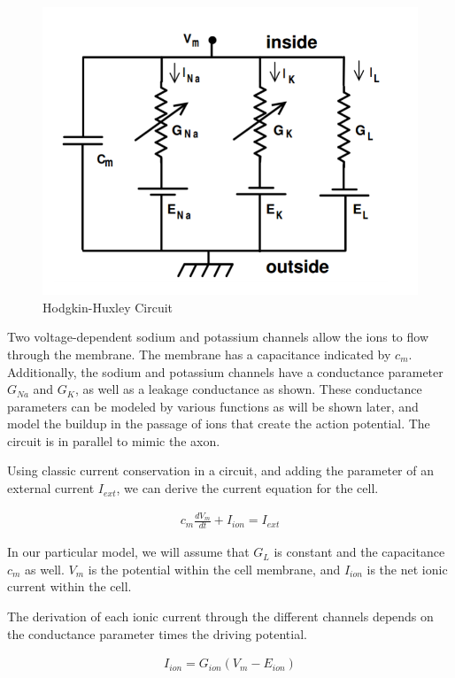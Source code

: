 \documentclass[12]{amsbook}
\newcommand\0{\mathbf{0}}
\newcommand\<{\langle}
\renewcommand\>{\rangle}
\begin{document}
\begin{figure}[h]
    \centering
    \includegraphics[scale=0.5]{hhmodel}
    \caption{Hodgkin-Huxley Circuit}
    \label{fig:my_label}
\end{figure}

Two voltage-dependent sodium and potassium channels allow the ions to flow through the membrane. The membrane has a capacitance indicated by $c_m$. Additionally, the sodium and potassium channels have a conductance parameter $G_{Na}$ and $G_K$, as well as a leakage conductance as shown. These conductance parameters can be modeled by various functions as will be shown later, and model the buildup in the passage of ions that create the action potential. The circuit is in parallel to mimic the axon. 

Using classic current conservation in a circuit, and adding the parameter of an external current $I_{ext}$, we can derive the current equation for the cell.

\begin{align*}
    c_m\frac{dV_m}{dt} + I_{ion} = I_{ext}
\end{align*}

In our particular model, we will assume that $G_L$ is constant and the capacitance $c_m$ as well. $V_m$ is the potential within the cell membrane, and $I_{ion}$ is the net ionic current within the cell.

The derivation of each ionic current through the different channels depends on the conductance parameter times the driving potential.

\begin{align*}
    I_{ion} = G_{ion}(V_{m}-E_{ion})
\end{align*}
\end{document}

